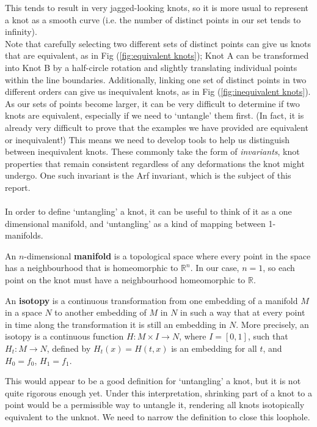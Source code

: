 \documentclass{article}
\begin{document}
This tends to result in very jagged-looking knots, so it is more usual to represent a knot as a smooth curve (i.e. the number of distinct points in our set tends to infinity).\\

Note that carefully selecting two different sets of distinct points can give us knots that are equivalent, as in Fig (\ref{fig:equivalent knots}); Knot A can be transformed into Knot B by a half-circle rotation and slightly translating individual points within the line boundaries. Additionally, linking one set of distinct points in two different orders can give us inequivalent knots, as in Fig (\ref{fig:inequivalent knots}). As our sets of points become larger, it can be very difficult to determine if two knots are equivalent, especially if we need to `untangle' them first. (In fact, it is already very difficult to prove that the examples we have provided are equivalent or inequivalent!) This means we need to develop tools to help us distinguish between inequivalent knots. These commonly take the form of \emph{invariants}, knot properties that remain consistent regardless of any deformations the knot might undergo. One such invariant is the Arf invariant, which is the subject of this report.\\
\\
In order to define `untangling' a knot, it can be useful to think of it as a one dimensional manifold, and `untangling' as a kind of mapping between 1-manifolds.\\

\begin{definition}[] An $n$-dimensional \textbf{manifold} is a topological space where every point in the space has a neighbourhood that is homeomorphic to $\mathbb{R}^n$. In our case, $n=1$, so each point on the knot must have a neighbourhood homeomorphic to $\mathbb{R}$.\\
\end{definition}



\begin{definition}[] An \textbf{isotopy} is a continuous transformation from one embedding of a manifold $M$ in a space $N$ to another embedding of $M$ in $N$ in such a way that at every point in time along the transformation it is still an embedding in $N$. More precisely, an isotopy is a continuous function $H: M\times I \rightarrow N$, where $I=[0,1]$, such that $H_t:M\rightarrow N$, defined by $H_t(x)=H(t,x)$ is an embedding for all $t$, and $H_0=f_0$, $H_1=f_1$.
\end{definition}
This would appear to be a good definition for `untangling' a knot, but it is not quite rigorous enough yet. Under this interpretation, shrinking part of a knot to a point would be a permissible way to untangle it, rendering all knots isotopically equivalent to the unknot. We need to narrow the definition to close this loophole.\\
\end{document}
